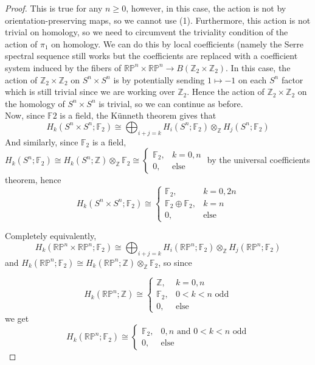 \documentclass[reqno]{amsart}
\theoremstyle{definition}
\theoremstyle{remark}
\begin{document}
\begin{proof}
This is true for any $n\ge 0$, however, in this case,
the action is not by orientation-preserving maps,
so we cannot use (1). Furthermore, this
action is not trivial on homology, so
we need to circumvent the triviality condition of the
action of $\pi_1$ on homology. We can do this
by local coefficients (namely the Serre spectral
sequence still works but the coefficients
are replaced with a coefficient system induced by the
fibers of 
$\mathbb{R}\mathbb{P}^{n} \times \mathbb{R}\mathbb{P}^{n}
\to B \left( \mathbb{Z}_2 \times \mathbb{Z}_2 \right) $.
In this case, the action of $\mathbb{Z}_2 \times \mathbb{Z}_2$ 
on $S^{n} \times S^{n}$ is by potentially
sending $1 \mapsto -1$ on
each $S^{n}$ factor which is still trivial since
we are working over $\mathbb{Z}_2$. Hence
the action of
$\mathbb{Z}_2 \times \mathbb{Z}_2$ on
 the homology of $S^{n} \times S^{n}$ is trivial, so we
 can continue as before.\\

Now, since $\mathbb{F}2$ is a field, the Künneth theorem gives that
\[
H_k \left( S^{n} \times S^{n};\mathbb{F}_2 \right) 
\cong 
\bigoplus_{i+j = k} H_i(S^{n};\mathbb{F}_2) 
\otimes_{\mathbb{Z}} H_j (S^{n} ;\mathbb{F}_2)
\] 
And similarly, since $\mathbb{F}_2$ is a field,
$H_k \left( S^{n};\mathbb{F}_2 \right) 
\cong H_k(S^{n};\mathbb{Z}) \otimes_{\mathbb{Z}}
\mathbb{F}_2 \cong
\begin{cases}
    \mathbb{F}_2,& k=0,n\\
    0,& \text{else}
\end{cases}$
by the universal coefficients theorem,
hence
\[
H_k\left( S^{n} \times S^{n}; \mathbb{F}_2 \right) 
\cong 
\begin{cases}
    \mathbb{F}_2,& k=0,2n\\
    \mathbb{F}_2 \oplus \mathbb{F}_2,& k=n\\
    0,& \text{else}
\end{cases}
\] 

Completely equivalently,
\[
H_k \left( \mathbb{R}\mathbb{P}^{n}
\times \mathbb{R}\mathbb{P}^{n}; \mathbb{F}_2\right) 
\cong
\bigoplus_{i+j = k}
H_i \left( \mathbb{R}\mathbb{P}^{n} ; \mathbb{F}_2 \right) 
\otimes_{\mathbb{Z}}
H_j \left( \mathbb{R}\mathbb{P}^{n} ; \mathbb{F}_2 \right) 
\] 
and
$H_k (\mathbb{R}\mathbb{P}^{n};\mathbb{F}_2) \cong
H_k \left( \mathbb{R}\mathbb{P}^{n} ; \mathbb{Z} \right) 
\otimes_{\mathbb{Z}} \mathbb{F}_2$, so since

\[
H_k \left( \mathbb{R}\mathbb{P}^{n}; \mathbb{Z} \right) 
\cong
\begin{cases}
    \mathbb{Z},& k=0,n\\
    \mathbb{F}_2,& 0 < k < n \text{ odd}\\
    0,& \text{else}
\end{cases}
\] 
we get
\[
H_k \left( \mathbb{R}\mathbb{P}^{n}; \mathbb{F}_2 \right) 
\cong
\begin{cases}
    \mathbb{F}_2,& 0,n \text{ and } 0 < k< n \text{ odd}\\
    0,& \text{else}
\end{cases}
\]


\end{proof}
\end{document}
